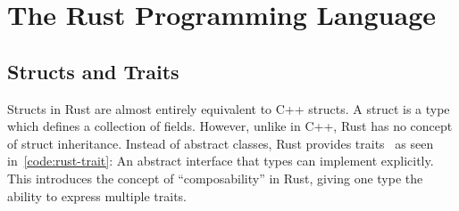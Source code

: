 \documentclass[11pt,
               a4paper,
               bibtotoc,
               idxtotoc,
               headsepline,
               footsepline,
               footexclude,
               BCOR12mm,
               DIV13,
               openany,   %
               ]
               {scrbook}
\begin{document}
\section{The Rust Programming Language}







\subsection{Structs and Traits}

Structs in Rust are almost entirely equivalent to C++ structs. A struct is a type which defines a collection of fields. However, unlike in C++, Rust has no concept of struct inheritance. Instead of abstract classes, Rust provides traits~\cite{rust-book-traits} as seen in~\autoref{code:rust-trait}: An abstract interface that types can implement explicitly. This introduces the concept of ``composability'' in Rust, giving one type the ability to express multiple traits.

\vspace{0.5em}
\end{document}

